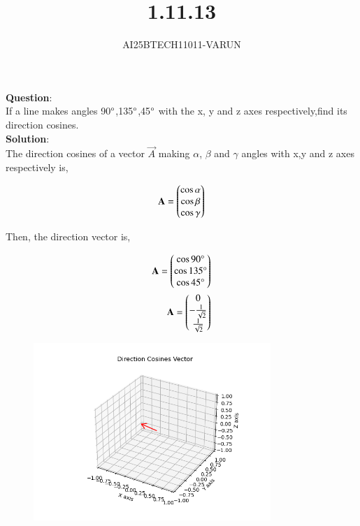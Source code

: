 \documentclass[journal]{IEEEtran}
\begin{document}

\vspace{3cm}

\title{1.11.13}
\author{AI25BTECH11011-VARUN}
 \maketitle
{\let\newpage\relax\maketitle}

\renewcommand{\thefigure}{\theenumi}
\renewcommand{\thetable}{\theenumi}
\setlength{\intextsep}{10pt} %


\renewcommand{\thetable}{\theenumi}
\textbf{Question}:\\
If a line makes angles 90$\degree$,135$\degree$,45$\degree$ with the x, y and z axes respectively,find its direction cosines.  \\
\textbf{Solution}:\\
The direction cosines of a vector $\vec{A}$ making $\alpha$, $\beta$ and $\gamma$ angles with x,y and z axes respectively is,

\begin{align}
    \mathbf{A} = \begin{pmatrix}\cos{\alpha} \\ \cos{\beta} \\ \cos{\gamma}\end{pmatrix}
\end{align}

Then, the direction vector is,

\begin{align}
    \mathbf{A} = \begin{pmatrix}\cos{90\degree} \\ \cos{135\degree} \\ \cos{45\degree}\end{pmatrix}  \\
    \mathbf{A} = \begin{pmatrix}0 \\ -\frac{1}{\sqrt{2}} \\ \frac{1}{\sqrt{2}}\end{pmatrix}
\end{align}

\begin{figure}[H]
    \centering
    \includegraphics[width=0.8\textwidth]{figs/Fig 1.png}
    \caption{}
    \label{fig:Parallelogram}
\end{figure}
\end{document}
